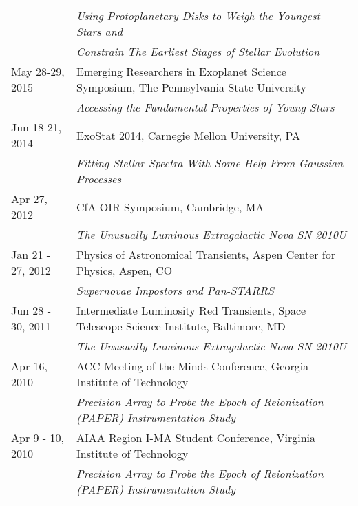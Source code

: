 \begin{longtable}{@{\hspace{10pt}}p{1.2in}l}
  & \emph{Using Protoplanetary Disks to Weigh the Youngest Stars and} \\
  & \emph{Constrain The Earliest Stages of Stellar Evolution} \\[\rowskip]
  May 28-29, 2015 & Emerging Researchers in Exoplanet Science Symposium, The Pennsylvania State University\\
  & \emph{Accessing the Fundamental Properties of Young Stars} \\[\rowskip]
  Jun 18-21, 2014 & ExoStat 2014, Carnegie Mellon University, PA \\
  & \emph{Fitting Stellar Spectra With Some Help From Gaussian Processes} \\[\rowskip]
  Apr 27, 2012 & CfA OIR Symposium, Cambridge, MA \\
  & \emph{The Unusually Luminous Extragalactic Nova SN 2010U}\\
  Jan 21 - 27, 2012 & Physics of Astronomical Transients, Aspen Center for Physics, Aspen, CO \\
  & \emph{Supernovae Impostors and Pan-STARRS} \\[\rowskip]
  Jun 28 - 30, 2011 & Intermediate Luminosity Red Transients, Space Telescope Science Institute, Baltimore, MD\\
  & \emph{The Unusually Luminous Extragalactic Nova SN 2010U} \\[\rowskip]
  Apr 16, 2010 & ACC Meeting of the Minds Conference, Georgia Institute of Technology \\
  & \emph{Precision Array to Probe the Epoch of Reionization (PAPER) Instrumentation Study} \\[\rowskip]
  Apr 9 - 10, 2010 &  AIAA Region I-MA Student Conference, Virginia Institute of Technology\\
  & \emph{Precision Array to Probe the Epoch of Reionization (PAPER) Instrumentation Study} \\[\rowskip]
\end{longtable}
